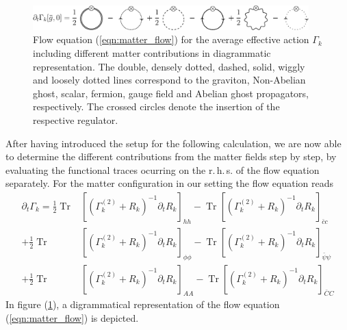 \begin{figure}[t]
	\centering
	\includegraphics[width=0.95\textwidth]{figs/TikZ/matter_corrections}
\caption[Flow equation for the average effective action $\Gamma_k$ including different matter contributions in diagrammatic representation.]{Flow equation (\ref{eqn:matter_flow}) for the average effective action $\Gamma_k$ including different matter contributions in diagrammatic representation. The double, densely dotted, dashed, solid, wiggly and loosely dotted lines correspond to the graviton, Non-Abelian ghost, scalar, fermion, gauge field  and Abelian ghost propagators, respectively. The crossed circles denote the insertion of the respective regulator.}
	\label{fig:matter_calc}
	\hrulefill
\end{figure}
After having introduced the setup for the following calculation, we are now able to determine the different contributions from the matter fields step by step, by evaluating the functional traces ocurring on the r.\,h.\,s. of the flow equation separately. For the matter configuration in our setting the flow equation reads
\begin{equation}
\begin{aligned}
 \partial_t\Gamma_{k} =\frac{1}{2} \operatorname{Tr}&\left[\left(\Gamma^{(2)}_k+R_{k}\right)^{-1} \partial_t R_{k}\right]_{h h} - \operatorname{Tr}\left[\left(\Gamma^{(2)}_k+R_{k}\right)^{-1} \partial_t R_{k}\right]_{\bar{c}c}\\[10pt]
 + \frac{1}{2}\operatorname{Tr}&\left[\left(\Gamma^{(2)}_k+R_{k}\right)^{-1} \partial_t R_{k}\right]_{\phi\phi}  -\operatorname{Tr}\left[\left(\Gamma^{(2)}_k+R_{k}\right)^{-1}\partial_t R_{k}\right]_{\bar{\psi} \psi} \\[10pt]
 +\frac{1}{2} \operatorname{Tr}&\left[\left(\Gamma^{(2)}_k+R_{k}\right)^{-1}\partial_t R_{k}\right]_{AA} - \operatorname{Tr}\left[\left(\Gamma^{(2)}_k+R_{k}\right)^{-1} \partial_t R_{k}\right]_{\bar{C}C}\end{aligned}
\label{eqn:matter_flow}
\end{equation}
In figure (\ref{fig:matter_calc}), a digrammatical representation of the flow equation (\ref{eqn:matter_flow}) is depicted.


